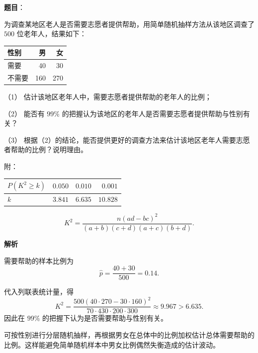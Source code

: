 \begin{answer}

\textbf{题目}：

为调查某地区老人是否需要志愿者提供帮助，用简单随机抽样方法从该地区调查了 $500$ 位老年人，结果如下：

\begin{center}
\begin{tabular}{lrr}
\toprule
性别 & 男 & 女 \\
\midrule
需要 & 40 & 30 \\
不需要 & 160 & 270 \\
\bottomrule
\end{tabular}
\end{center}

（1） 估计该地区老年人中，需要志愿者提供帮助的老年人的比例；

（2） 能否有 $99\%$ 的把握认为该地区的老年人是否需要志愿者提供帮助与性别有关？

（3） 根据（2）的结论，能否提供更好的调查方法来估计该地区老年人需要志愿者帮助的比例？说明理由。

附：

\begin{center}
\begin{tabular}{lrrr}
\toprule
$P(K^2\geq k)$ & $0.050$ & $0.010$ & $0.001$ \\
\midrule
$k$ & $3.841$ & $6.635$ & $10.828$ \\
\bottomrule
\end{tabular}
\end{center}

\nopagebreak[4]
\[
K^2=\frac{n(ad-bc)^2}{(a+b)(c+d)(a+c)(b+d)}.
\]

\textbf{解析}


需要帮助的样本比例为
\nopagebreak[4]
\[
\hat p=\frac{40+30}{500}=0.14.
\]


代入列联表统计量，得
\nopagebreak[4]
\[
K^2=\frac{500(40\cdot270-30\cdot160)^2}{70\cdot430\cdot200\cdot300}
\approx9.967>6.635.
\]
因此在 $99\%$ 的把握下认为是否需要帮助与性别有关。


可按性别进行分层随机抽样，再根据男女在总体中的比例加权估计总体需要帮助的比例。这样能避免简单随机样本中男女比例偶然失衡造成的估计波动。




\end{answer}
